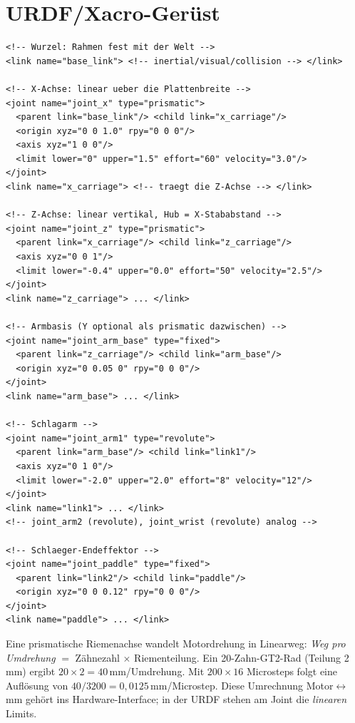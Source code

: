 \section{URDF/Xacro-Gerüst}
\begin{lstlisting}[style=xml,caption={Gantry + Schlagarm als URDF (gekürzt)}]
<!-- Wurzel: Rahmen fest mit der Welt -->
<link name="base_link"> <!-- inertial/visual/collision --> </link>

<!-- X-Achse: linear ueber die Plattenbreite -->
<joint name="joint_x" type="prismatic">
  <parent link="base_link"/> <child link="x_carriage"/>
  <origin xyz="0 0 1.0" rpy="0 0 0"/>
  <axis xyz="1 0 0"/>
  <limit lower="0" upper="1.5" effort="60" velocity="3.0"/>
</joint>
<link name="x_carriage"> <!-- traegt die Z-Achse --> </link>

<!-- Z-Achse: linear vertikal, Hub = X-Stababstand -->
<joint name="joint_z" type="prismatic">
  <parent link="x_carriage"/> <child link="z_carriage"/>
  <axis xyz="0 0 1"/>
  <limit lower="-0.4" upper="0.0" effort="50" velocity="2.5"/>
</joint>
<link name="z_carriage"> ... </link>

<!-- Armbasis (Y optional als prismatic dazwischen) -->
<joint name="joint_arm_base" type="fixed">
  <parent link="z_carriage"/> <child link="arm_base"/>
  <origin xyz="0 0.05 0" rpy="0 0 0"/>
</joint>
<link name="arm_base"> ... </link>

<!-- Schlagarm -->
<joint name="joint_arm1" type="revolute">
  <parent link="arm_base"/> <child link="link1"/>
  <axis xyz="0 1 0"/>
  <limit lower="-2.0" upper="2.0" effort="8" velocity="12"/>
</joint>
<link name="link1"> ... </link>
<!-- joint_arm2 (revolute), joint_wrist (revolute) analog -->

<!-- Schlaeger-Endeffektor -->
<joint name="joint_paddle" type="fixed">
  <parent link="link2"/> <child link="paddle"/>
  <origin xyz="0 0 0.12" rpy="0 0 0"/>
</joint>
<link name="paddle"> ... </link>
\end{lstlisting}

\begin{infobox}[title=Riemenübersetzung der Linearachsen]
Eine prismatische Riemenachse wandelt Motordrehung in Linearweg: \emph{Weg pro
Umdrehung} $=$ Zähnezahl $\times$ Riementeilung. Ein 20-Zahn-GT2-Rad (Teilung
2\,mm) ergibt $20\times2=40\,$mm/Umdrehung. Mit $200\times16$ Microsteps folgt
eine Auflösung von $40/3200=0{,}0125\,$mm/Microstep. Diese Umrechnung
Motor$\leftrightarrow$mm gehört ins Hardware-Interface; in der URDF stehen am
Joint die \emph{linearen} Limits.
\end{infobox}
